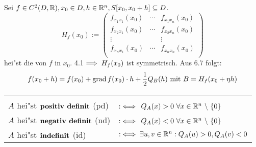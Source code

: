 \documentclass[a4paper,twoside,DIV15,BCOR12mm]{scrbook}
\begin{document}
\begin{beispiel}
Sei $f\in C^2(D,\mathbb{R}),x_0\in D, h\in \mathbb{R}^n, S[x_0,x_0+h]\subseteq D$.
$$H_f(x_0):=\begin{pmatrix}
f_{x_1x_1}(x_0)&\cdots&f_{x_1x_n}(x_0)\\
f_{x_2x_1}(x_0)&\cdots&f_{x_2x_n}(x_0)\\
\vdots& &\vdots\\
f_{x_nx_1}(x_0)&\cdots&f_{x_nx_n}(x_0)\\
\end{pmatrix}$$
hei"st die  von $f$ in $x_0$. 4.1$\implies H_f(x_0)$ ist symmetrisch. Aus 6.7 folgt:
$$f(x_0+h)=f(x_0)+\mathop{\rm grad}\nolimits f(x_0)\cdot h + \frac{1}{2}Q_B(h)\text{ mit }B=H_f(x_0+\eta h)$$
\end{beispiel}
\begin{definition*}
\begin{tabular}{ll}
\\ %
\\
$A$ hei"st $\begriff{positiv definit}$ (pd) & $:\iff$ $Q_A(x)>0\ \forall x\in\MdR^n\ \backslash\ \{0\}$\\
$A$ hei"st $\begriff{negativ definit}$ (nd) & $:\iff$ $Q_A(x)<0\ \forall x\in\MdR^n\ \backslash\ \{0\}$\\
$A$ hei"st $\begriff{indefinit}$ (id) & $:\iff \exists u,v\in\mathbb{R}^n: Q_A(u)>0, Q_A(v)<0$
\end{tabular}
\end{definition*}
\end{document}
